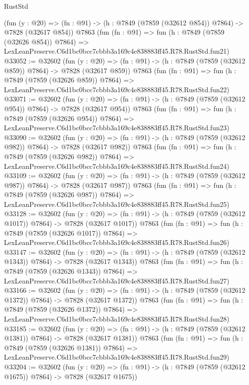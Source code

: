 \begin{lexlean}{RustStd}
\begin{coremodule}
    (fun (y : @20) => (fn : @91) -> (h : @7849 (@7859 (@32612 @854)) @7864) -> @7828 (@32617 @854))
    @7863
    (fun (fn : @91) =>
    fun (h : @7849 (@7859 (@32626 @854)) @7864) =>
    LexLeanPreserve.C6d1bc0bcc7cbbb3a169c4e838883ff45.R78.RustStd.fun21)
@33052 := @32602
    (fun (y : @20) => (fn : @91) -> (h : @7849 (@7859 (@32612 @859)) @7864) -> @7828 (@32617 @859))
    @7863
    (fun (fn : @91) =>
    fun (h : @7849 (@7859 (@32626 @859)) @7864) =>
    LexLeanPreserve.C6d1bc0bcc7cbbb3a169c4e838883ff45.R78.RustStd.fun22)
@33071 := @32602
    (fun (y : @20) => (fn : @91) -> (h : @7849 (@7859 (@32612 @954)) @7864) -> @7828 (@32617 @954))
    @7863
    (fun (fn : @91) =>
    fun (h : @7849 (@7859 (@32626 @954)) @7864) =>
    LexLeanPreserve.C6d1bc0bcc7cbbb3a169c4e838883ff45.R78.RustStd.fun23)
@33090 := @32602
    (fun (y : @20) => (fn : @91) -> (h : @7849 (@7859 (@32612 @982)) @7864) -> @7828 (@32617 @982))
    @7863
    (fun (fn : @91) =>
    fun (h : @7849 (@7859 (@32626 @982)) @7864) =>
    LexLeanPreserve.C6d1bc0bcc7cbbb3a169c4e838883ff45.R78.RustStd.fun24)
@33109 := @32602
    (fun (y : @20) => (fn : @91) -> (h : @7849 (@7859 (@32612 @987)) @7864) -> @7828 (@32617 @987))
    @7863
    (fun (fn : @91) =>
    fun (h : @7849 (@7859 (@32626 @987)) @7864) =>
    LexLeanPreserve.C6d1bc0bcc7cbbb3a169c4e838883ff45.R78.RustStd.fun25)
@33128 := @32602
    (fun (y : @20) =>
    (fn : @91) -> (h : @7849 (@7859 (@32612 @1017)) @7864) -> @7828 (@32617 @1017))
    @7863
    (fun (fn : @91) =>
    fun (h : @7849 (@7859 (@32626 @1017)) @7864) =>
    LexLeanPreserve.C6d1bc0bcc7cbbb3a169c4e838883ff45.R78.RustStd.fun26)
@33147 := @32602
    (fun (y : @20) =>
    (fn : @91) -> (h : @7849 (@7859 (@32612 @1343)) @7864) -> @7828 (@32617 @1343))
    @7863
    (fun (fn : @91) =>
    fun (h : @7849 (@7859 (@32626 @1343)) @7864) =>
    LexLeanPreserve.C6d1bc0bcc7cbbb3a169c4e838883ff45.R78.RustStd.fun27)
@33166 := @32602
    (fun (y : @20) =>
    (fn : @91) -> (h : @7849 (@7859 (@32612 @1372)) @7864) -> @7828 (@32617 @1372))
    @7863
    (fun (fn : @91) =>
    fun (h : @7849 (@7859 (@32626 @1372)) @7864) =>
    LexLeanPreserve.C6d1bc0bcc7cbbb3a169c4e838883ff45.R78.RustStd.fun28)
@33185 := @32602
    (fun (y : @20) =>
    (fn : @91) -> (h : @7849 (@7859 (@32612 @1381)) @7864) -> @7828 (@32617 @1381))
    @7863
    (fun (fn : @91) =>
    fun (h : @7849 (@7859 (@32626 @1381)) @7864) =>
    LexLeanPreserve.C6d1bc0bcc7cbbb3a169c4e838883ff45.R78.RustStd.fun29)
@33204 := @32602
    (fun (y : @20) =>
    (fn : @91) -> (h : @7849 (@7859 (@32612 @1675)) @7864) -> @7828 (@32617 @1675))

\end{coremodule}
\end{lexlean}
